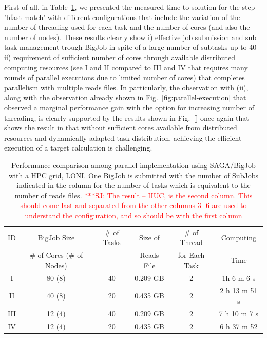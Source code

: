 \documentclass[12pt]{article}
\newcommand{\jhanote}[1]{ {\textcolor{red}     {***SJ: #1}}}
\newcommand{\jhanote}[1]{}
\begin{document}
First of all, in Table~\ref{table:bigjob-loni}, we presented the measured time-to-solution for the step 'bfast match' with different configurations that include the variation of the number of threading used for each task and the number of cores (and also the number of nodes).   These results clearly show i) effective job submission and sub task management trough BigJob in spite of a large number of subtasks up to 40 ii) requirement of sufficient number of cores through available distributed computing resources (see I and II compared to III and IV that requires many rounds of parallel executions due to limited number of cores) that completes parallelism with multiple reads files.  In particularly, the observation with (ii), along with the observation already shown in Fig.~\ref{fig:parallel-execution} that observed a marginal performance gain with the option for increasing number of threading, is clearly supported by the results shown in Fig.~\ref{} once again that shows the result in that without sufficient cores available from distributed resources and dynamically adapted task distribution, achieving the efficient execution of a target calculation is challenging.


 \begin{table}
 \begin{tabular}{|ccccc|c |} 
 \hline 
ID & BigJob Size  &  \# of Tasks & Size of  & \# of Thread  &   Computing  \\
   & \# of Cores (\# of Nodes) &  & Reads File & for Each Task &  Time\\\hline
I   & 80  (8) &  40 & 0.209 GB & 2 & 1h 6 m 6 s \\
II  & 40 (8)  &  20 & 0.435 GB & 2 & 2 h 13 m 51 s\\
III & 12 (4)  & 40  & 0.209 GB & 2 & 7 h 10 m 7 s \\
IV & 12 (4)  & 20 & 0.435 GB & 2 &  6 h 37 m 52  \\
\hline
\end{tabular}
\caption{Performance comparison among parallel implementation using SAGA/BigJob with a HPC grid, LONI. One BigJob is submitted with the number of SubJobs indicated in the column for the number of tasks which is equivalent to the number of reads files.\jhanote{The result -- IIUC, is the second column. This should come last and separated from the other columns 3- 6 are used to understand the configuration, and so should be with the first column}}
  \label{table:bigjob-loni} 
\end{table}
 
\end{document}
